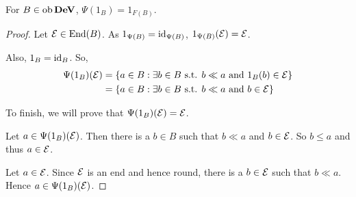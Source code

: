 \begin{theorem}
	For \( B \in \operatorname{ob}{\bf{DeV}} \), \( \Psi(1_B) = 1_{F(B)} \).
\end{theorem}
\begin{proof}
	Let \( \mathcal{E} \in \operatorname{End}(B) \).  As \( 1_{\Psi(B)} = \operatorname{id}_{\Psi(B)} \), \( 1_{\Psi(B)}(\mathcal{E}) = \mathcal{E} \).
	
	Also, \( 1_B = \operatorname{id}_B \).  So,
	\begin{align*}
		\Psi(1_B)(\mathcal{E}) &= \{ a \in B: \exists b \in B \text{ s.t. } b \ll a \text{ and } 1_B(b) \in \mathcal{E} \} \\
		&= \{ a \in B: \exists b \in B \text{ s.t. } b \ll a \text{ and } b \in \mathcal{E} \}
	\end{align*}

	To finish, we will prove that \( \Psi(1_B)(\mathcal{E}) = \mathcal{E} \).
	
	Let \( a \in \Psi(1_B)(\mathcal{E}) \).  Then there is a \( b \in B \) such that \( b \ll a \) and \( b \in \mathcal{E} \).  So \( b \leq a \) and thus \( a \in \mathcal{E} \).
	
	Let \( a \in \mathcal{E} \).  Since \( \mathcal{E} \) is an end and hence round, there is a \( b \in \mathcal{E} \) such that \( b \ll a \).  Hence \( a \in \Psi(1_B)(\mathcal{E}) \). 
\end{proof}

